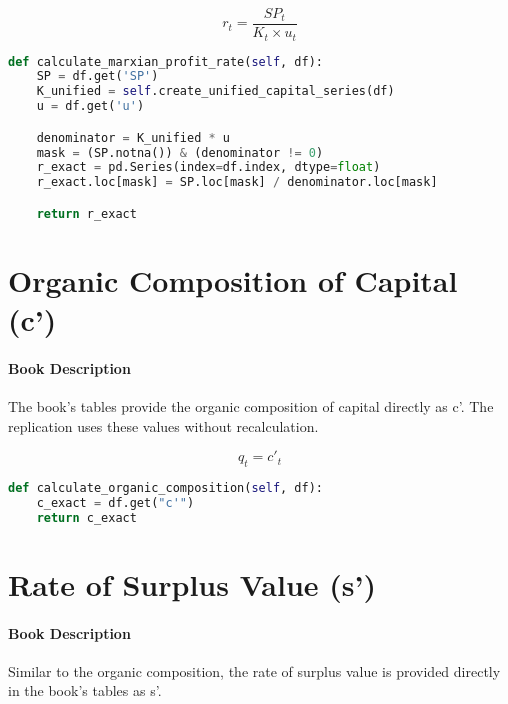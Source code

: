\documentclass[12pt,a4paper]{article}
\begin{document}
\begin{equation*}
r_t = \frac{SP_t}{K_t \times u_t}
\end{equation*}

\begin{tcolorbox}[colback=gray!5!white,colframe=gray!60!black,title=Python Implementation]
\begin{lstlisting}[language=Python]
def calculate_marxian_profit_rate(self, df):
    SP = df.get('SP')
    K_unified = self.create_unified_capital_series(df)
    u = df.get('u')

    denominator = K_unified * u
    mask = (SP.notna()) & (denominator != 0)
    r_exact = pd.Series(index=df.index, dtype=float)
    r_exact.loc[mask] = SP.loc[mask] / denominator.loc[mask]

    return r_exact
\end{lstlisting}
\end{tcolorbox}

\section{Organic Composition of Capital (c')}

\paragraph{Book Description} The book's tables provide the organic composition of capital directly as c'. The replication uses these values without recalculation.

\begin{equation*}
q_t = c'_t
\end{equation*}

\begin{tcolorbox}[colback=gray!5!white,colframe=gray!60!black,title=Python Implementation]
\begin{lstlisting}[language=Python]
def calculate_organic_composition(self, df):
    c_exact = df.get("c'")
    return c_exact
\end{lstlisting}
\end{tcolorbox}

\section{Rate of Surplus Value (s')}

\paragraph{Book Description} Similar to the organic composition, the rate of surplus value is provided directly in the book's tables as s'.
\end{document}
